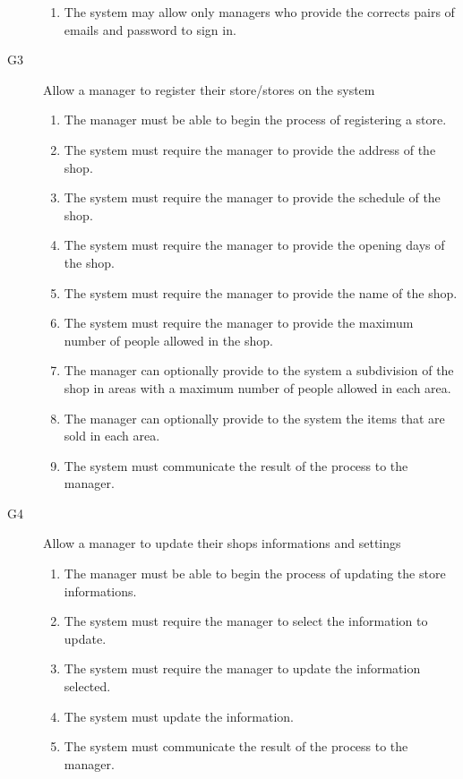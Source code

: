 \begin{description}
\begin{enumerate}[resume*]
            \item The system may allow only managers who provide the corrects pairs of emails and password to sign in.
        \end{enumerate}
    \item [G3] Allow a manager to register their store/stores on the system
        \begin{enumerate}[resume*]
            \item The manager must be able to begin the process of registering a store.
            \item The system must require the manager to provide the address of the shop.
            \item The system must require the manager to provide the schedule of the shop.
            \item The system must require the manager to provide the opening days of the shop.
            \item The system must require the manager to provide the name of the shop.
            \item The system must require the manager to provide the maximum number of people allowed in the shop.
            \item The manager can optionally provide to the system a subdivision of the shop in areas with a maximum number of people allowed in each area.
            \item The manager can optionally provide to the system the items that are sold in each area.
            \item The system must communicate the result of the process to the manager.
        \end{enumerate}
    \item [G4] Allow a manager to update their shops informations and settings
        \begin{enumerate}[resume*]
            \item The manager must be able to begin the process of updating the store informations.
            \item The system must require the manager to select the information to update.
            \item The system must require the manager to update the information selected.
            \item The system must update the information.
            \item The system must communicate the result of the process to the manager. 
        \end{enumerate}

\end{description}
